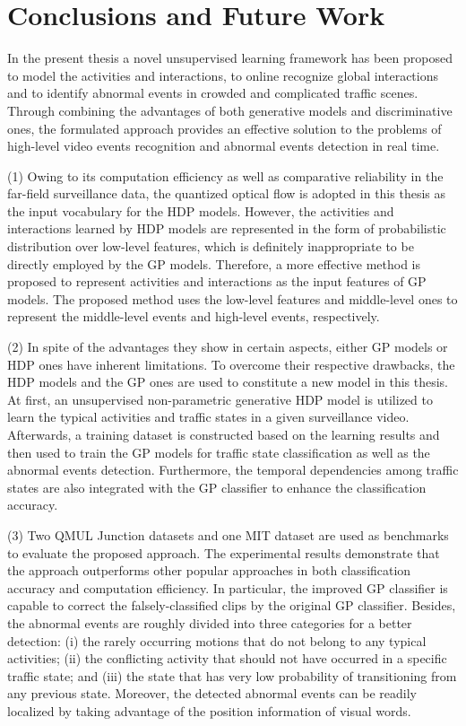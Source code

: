 \chapter{Conclusions and Future Work}
\label{chap:conclusion}
In the present thesis a novel unsupervised learning framework has been proposed to model the activities and interactions, to online recognize global interactions and to identify abnormal events in crowded and complicated traffic scenes. Through combining the advantages of both generative models and discriminative ones, the formulated approach provides an effective solution to the problems of high-level video events recognition and abnormal events detection in real time. 

(1) Owing to its computation efficiency as well as comparative reliability in the far-field surveillance data, the quantized optical flow is adopted in this thesis as the input vocabulary for the HDP models. However, the activities and interactions learned by HDP models are represented in the form of probabilistic distribution over low-level features, which is definitely inappropriate to be directly employed by the GP models. Therefore, a more effective method is proposed to represent activities and interactions as the input features of GP models. The proposed method uses the low-level features and middle-level ones to represent the middle-level events and high-level events, respectively. 

(2) In spite of the advantages they show in certain aspects, either GP models or HDP ones have inherent limitations. To overcome their respective drawbacks, the HDP models and the GP ones are used to constitute a new model in this thesis. At first, an unsupervised non-parametric generative HDP model is utilized to learn the typical activities and traffic states in a given surveillance video. Afterwards, a training dataset is constructed based on the learning results and then used to train the GP models for traffic state classification as well as the abnormal events detection. Furthermore, the temporal dependencies among traffic states are also integrated with the GP classifier to enhance the classification accuracy. 

(3) Two QMUL Junction datasets and one MIT dataset are used as benchmarks to evaluate the proposed approach. The experimental results demonstrate that the approach outperforms other popular approaches in both classification accuracy and computation efficiency. In particular, the improved GP classifier is capable to correct the falsely-classified clips by the original GP classifier. Besides, the abnormal events are roughly divided into three categories for a better detection: (i) the rarely occurring motions that do not belong to any typical activities; (ii) the conflicting activity that should not have occurred in a specific traffic state; and (iii) the state that has very low probability of transitioning from any previous state. Moreover, the detected abnormal events can be readily localized by taking advantage of the position information of visual words. 


